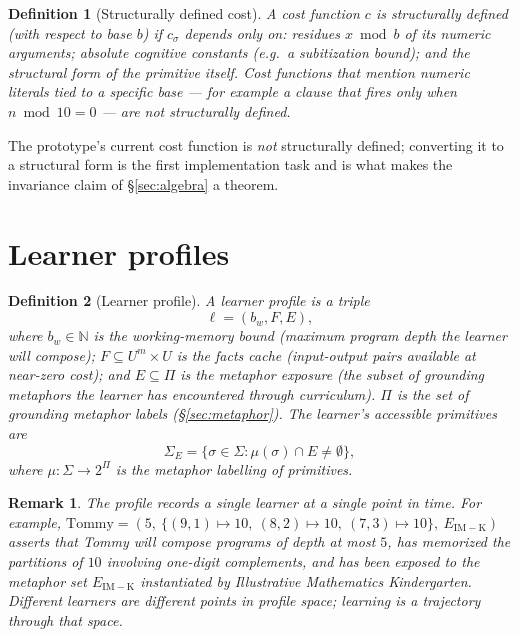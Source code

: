 \documentclass[11pt]{article}
\newtheorem{definition}{Definition}
\newtheorem{remark}{Remark}
\begin{document}
\begin{definition}[Structurally defined cost]
\label{def:structural-cost}
A cost function $c$ is \emph{structurally defined} (with respect to
base $b$) if $c_\sigma$ depends only on: residues $x \bmod b$ of its
numeric arguments; absolute cognitive constants (e.g.\ a subitization
bound); and the structural form of the primitive itself. Cost
functions that mention numeric literals tied to a specific base — for
example a clause that fires only when $n \bmod 10 = 0$ — are
\emph{not} structurally defined.
\end{definition}

\noindent The prototype's current cost function is \emph{not}
structurally defined; converting it to a structural form is the first
implementation task and is what makes the invariance claim of
\S\ref{sec:algebra} a theorem.

\section{Learner profiles}

\begin{definition}[Learner profile]
A \emph{learner profile} is a triple
\[
\ell = (b_w, F, E),
\]
where $b_w \in \mathbb{N}$ is the \emph{working-memory bound} (maximum
program depth the learner will compose); $F \subseteq U^m \times U$ is
the \emph{facts cache} (input-output pairs available at near-zero
cost); and $E \subseteq \Pi$ is the \emph{metaphor exposure} (the
subset of grounding metaphors the learner has encountered through
curriculum). $\Pi$ is the set of grounding metaphor labels
(\S\ref{sec:metaphor}). The learner's accessible primitives are
\[
\Sigma_E = \{\sigma \in \Sigma : \mu(\sigma) \cap E \ne \emptyset\},
\]
where $\mu:\Sigma \to 2^{\Pi}$ is the metaphor labelling of primitives.
\end{definition}

\begin{remark}
The profile records a single learner at a single point in time. For
example, $\text{Tommy} = (5,\ \{(9,1)\mapsto 10,\ (8,2)\mapsto 10,\
(7,3)\mapsto 10\},\ E_{\mathrm{IM-K}})$ asserts that Tommy will compose
programs of depth at most $5$, has memorized the partitions of $10$
involving one-digit complements, and has been exposed to the metaphor
set $E_{\mathrm{IM-K}}$ instantiated by Illustrative Mathematics
Kindergarten. Different learners are different points in profile
space; learning is a trajectory through that space.
\end{remark}
\end{document}
